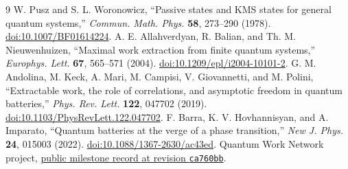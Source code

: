 \documentclass[11pt,a4paper]{article}
\begin{document}
\begin{thebibliography}{9}
 W. Pusz and S. L. Woronowicz, ``Passive states and KMS states for general quantum systems,'' \emph{Commun. Math. Phys.} \textbf{58}, 273--290 (1978). \href{https://doi.org/10.1007/BF01614224}{doi:10.1007/BF01614224}.
 A. E. Allahverdyan, R. Balian, and Th. M. Nieuwenhuizen, ``Maximal work extraction from finite quantum systems,'' \emph{Europhys. Lett.} \textbf{67}, 565--571 (2004). \href{https://doi.org/10.1209/epl/i2004-10101-2}{doi:10.1209/epl/i2004-10101-2}.
 G. M. Andolina, M. Keck, A. Mari, M. Campisi, V. Giovannetti, and M. Polini, ``Extractable work, the role of correlations, and asymptotic freedom in quantum batteries,'' \emph{Phys. Rev. Lett.} \textbf{122}, 047702 (2019). \href{https://doi.org/10.1103/PhysRevLett.122.047702}{doi:10.1103/PhysRevLett.122.047702}.
 F. Barra, K. V. Hovhannisyan, and A. Imparato, ``Quantum batteries at the verge of a phase transition,'' \emph{New J. Phys.} \textbf{24}, 015003 (2022). \href{https://doi.org/10.1088/1367-2630/ac43ed}{doi:10.1088/1367-2630/ac43ed}.
 Quantum Work Network project, \href{https://github.com/Riku-Tono/quantum-work-network/tree/ca760bb64584bb84ed8c917010c60faa0c092da0}{public milestone record at revision \texttt{ca760bb}}.
\end{thebibliography}
\end{document}
